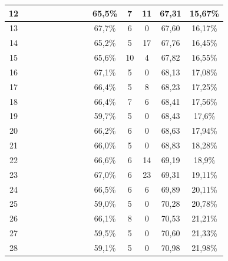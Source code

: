 \begin{longtable}{|c|c|c|c|c|c|c|c|c|c|c|c|c|c|}
12 &  \x    & \x    & \x    & \x    & \x\m  & \x\m  & \x\m  &       & 65,5\% &  7  & 11 & 67,31 & 15,67\% \\ \hline
13 &  \x    & \x    & \x    &       & \x\m  & \x    &       &       & 67,7\% &  6  & 0  & 67,60 & 16,17\% \\ \hline
14 &  \x    & \x    & \x    & \x    & \x\m  &       & \x\m  &       & 65,2\% &  5  & 17 & 67,76 & 16,45\% \\ \hline
15 &  \x    & \x    & \x    &       & \x\m  & \x\m  & \x\m  &       & 65,6\% &  10 & 4  & 67,82 & 16,55\% \\ \hline
16 &  \x    & \x    & \x    &       & \x\m  & \x    & \x    &       & 67,1\% &  5  & 0  & 68,13 & 17,08\% \\ \hline
17 &  \x    & \x    & \x    & \x    & \x\m  & \x    &       & \x\m  & 66,4\% &  5  & 8  & 68,23 & 17,25\% \\ \hline
18 &  \x    & \x    & \x    & \x    & \x\m  &       &       & \x    & 66,4\% &  7  & 6  & 68,41 & 17,56\% \\ \hline
19 &  \x    & \x    & \x    &       & \x    & \x    & \x    &       & 59,7\% &  5  & 0  & 68,43 & 17,6\% \\ \hline
20 &  \x    & \x    &       & \x    & \x\m  & \x\m  &       & \x\m  & 66,2\% &  6  & 0  & 68,63 & 17,94\% \\ \hline
21 &  \x    & \x    & \x    & \x    & \x\m  &       &       & \x\m  & 66,0\% &  5  & 0  & 68,83 & 18,28\% \\ \hline
22 &  \x    & \x    & \x    &       & \x\m  &       & \x    &       & 66,6\% &  6  & 14 & 69,19 & 18,9\% \\ \hline
23 &  \x    & \x    & \x    & \x    & \x\m  & \x    &       & \x    & 67,0\% &  6  & 23 & 69,31 & 19,11\% \\ \hline
24 &  \x    & \x    & \x    &       & \x\m  &       & \x\m  &       & 66,5\% &  6  & 6  & 69,89 & 20,11\% \\ \hline
25 &  \x    & \x    & \x    & \x    & \x    & \x    &       & \x    & 59,0\% &  5  & 0  & 70,28 & 20,78\% \\ \hline
26 &  \x    & \x    & \x    &       & \x\m  &       & \x\m  &       & 66,1\% &  8  & 0  & 70,53 & 21,21\% \\ \hline
27 &  \x    & \x    & \x    & \x    & \x    & \x\m  &       & \x    & 59,5\% &  5  & 0  & 70,60 & 21,33\% \\ \hline
28 &  \x    & \x    & \x    &       & \x    & \x    &       &       & 59,1\% &  5  & 0  & 70,98 & 21,98\% \\ \hline

\end{longtable}
